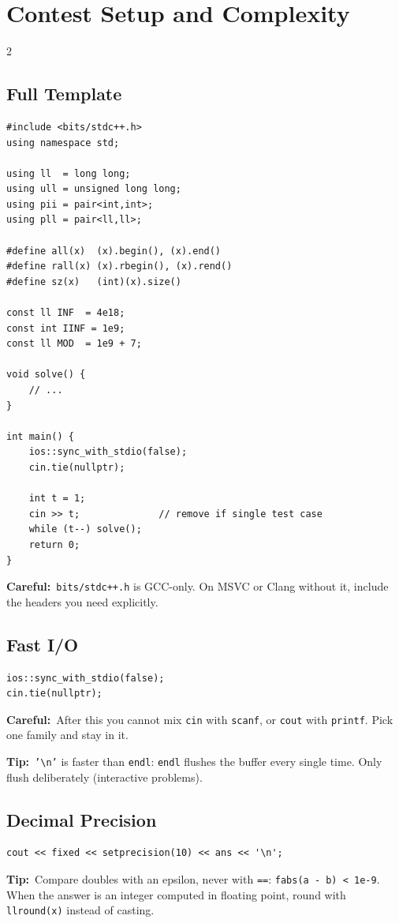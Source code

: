 \documentclass[10pt]{article}
\newcommand{\code}[1]{\texttt{\small #1}}
\newcommand{\tip}[1]{{\color{tipc}\footnotesize\textbf{Tip:}}~{\footnotesize #1}\par}
\newcommand{\warn}[1]{{\color{warnc}\footnotesize\textbf{Careful:}}~{\footnotesize #1}\par}
\begin{document}
\section{Contest Setup and Complexity}
\begin{multicols}{2}

\subsection{Full Template}
\begin{lstlisting}
#include <bits/stdc++.h>
using namespace std;

using ll  = long long;
using ull = unsigned long long;
using pii = pair<int,int>;
using pll = pair<ll,ll>;

#define all(x)  (x).begin(), (x).end()
#define rall(x) (x).rbegin(), (x).rend()
#define sz(x)   (int)(x).size()

const ll INF  = 4e18;
const int IINF = 1e9;
const ll MOD  = 1e9 + 7;

void solve() {
    // ...
}

int main() {
    ios::sync_with_stdio(false);
    cin.tie(nullptr);

    int t = 1;
    cin >> t;              // remove if single test case
    while (t--) solve();
    return 0;
}
\end{lstlisting}
\warn{\code{bits/stdc++.h} is GCC-only. On MSVC or Clang without it,
include the headers you need explicitly.}

\subsection{Fast I/O}
\begin{lstlisting}
ios::sync_with_stdio(false);
cin.tie(nullptr);
\end{lstlisting}
\warn{After this you cannot mix \code{cin} with \code{scanf}, or
\code{cout} with \code{printf}. Pick one family and stay in it.}

\tip{\code{'\textbackslash n'} is faster than \code{endl}: \code{endl}
flushes the buffer every single time. Only flush deliberately (interactive
problems).}

\subsection{Decimal Precision}
\begin{lstlisting}
cout << fixed << setprecision(10) << ans << '\n';
\end{lstlisting}
\tip{Compare doubles with an epsilon, never with \code{==}:
\code{fabs(a - b) < 1e-9}. When the answer is an integer computed in
floating point, round with \code{llround(x)} instead of casting.}


\end{multicols}
\end{document}

